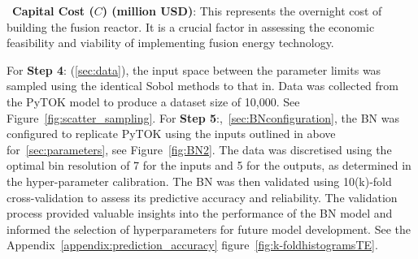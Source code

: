 \documentclass[journal]{IEEEtran}
\begin{document}
~\textbf{Capital Cost ($C$) (million USD)}: This represents the overnight cost of building the fusion reactor. It is a crucial factor in assessing the economic feasibility and viability of implementing fusion energy technology. 

For \textbf{Step 4}: (\ref{sec:data}), the input space between the parameter limits was sampled using the identical Sobol methods to that in\cite{Griffiths2024}. Data was collected from the PyTOK model to produce a dataset size of 10,000. See Figure~\ref{fig:scatter_sampling}. For \textbf{Step 5}:,~\ref{sec:BNconfiguration}, the BN was configured to replicate PyTOK using the inputs outlined in above for~\ref{sec:parameters}, see Figure~\ref{fig:BN2}. The data was discretised using the optimal bin resolution of 7 for the inputs and 5 for the outputs, as determined in the hyper-parameter calibration. The BN was then validated using 10(k)-fold cross-validation to assess its predictive accuracy and reliability. The validation process provided valuable insights into the performance of the BN model and informed the selection of hyperparameters for future model development. See the Appendix~\ref{appendix:prediction_accuracy} figure~\ref{fig:k-foldhistogramsTE}.
\end{document}
